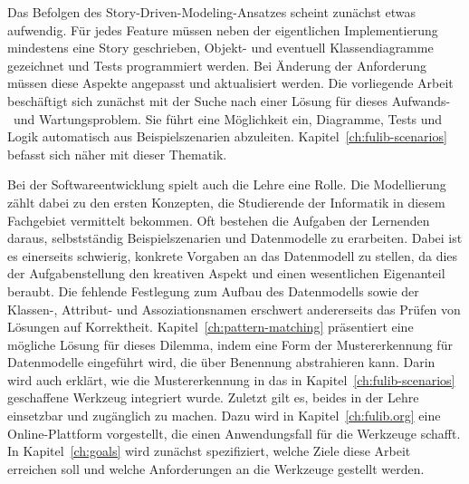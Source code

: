 Das Befolgen des Story-Driven-Modeling-Ansatzes scheint zunächst etwas aufwendig.
Für jedes Feature müssen neben der eigentlichen Implementierung mindestens eine Story geschrieben, Objekt- und eventuell Klassendiagramme gezeichnet und Tests programmiert werden.
Bei Änderung der Anforderung müssen diese Aspekte angepasst und aktualisiert werden.
Die vorliegende Arbeit beschäftigt sich zunächst mit der Suche nach einer Lösung für dieses Aufwands-\ und Wartungsproblem.
Sie führt eine Möglichkeit ein, Diagramme, Tests und Logik automatisch aus Beispielszenarien abzuleiten.
Kapitel~\ref{ch:fulib-scenarios} befasst sich näher mit dieser Thematik.

Bei der Softwareentwicklung spielt auch die Lehre eine Rolle.
Die Modellierung zählt dabei zu den ersten Konzepten, die Studierende der Informatik in diesem Fachgebiet vermittelt bekommen.
Oft bestehen die Aufgaben der Lernenden daraus, selbstständig Beispielszenarien und Datenmodelle zu erarbeiten.
Dabei ist es einerseits schwierig, konkrete Vorgaben an das Datenmodell zu stellen, da dies der Aufgabenstellung den kreativen Aspekt und einen wesentlichen Eigenanteil beraubt.
Die fehlende Festlegung zum Aufbau des Datenmodells sowie der Klassen-, Attribut- und Assoziationsnamen erschwert andererseits das Prüfen von Lösungen auf Korrektheit.
Kapitel~\ref{ch:pattern-matching} präsentiert eine mögliche Lösung für dieses Dilemma, indem eine Form der Mustererkennung für Datenmodelle eingeführt wird, die über Benennung abstrahieren kann.
Darin wird auch erklärt, wie die Mustererkennung in das in Kapitel~\ref{ch:fulib-scenarios} geschaffene Werkzeug integriert wurde.
Zuletzt gilt es, beides in der Lehre einsetzbar und zugänglich zu machen.
Dazu wird in Kapitel~\ref{ch:fulib.org} eine Online-Plattform vorgestellt, die einen Anwendungsfall für die Werkzeuge schafft.
In Kapitel~\ref{ch:goals} wird zunächst spezifiziert, welche Ziele diese Arbeit erreichen soll und welche Anforderungen an die Werkzeuge gestellt werden.
